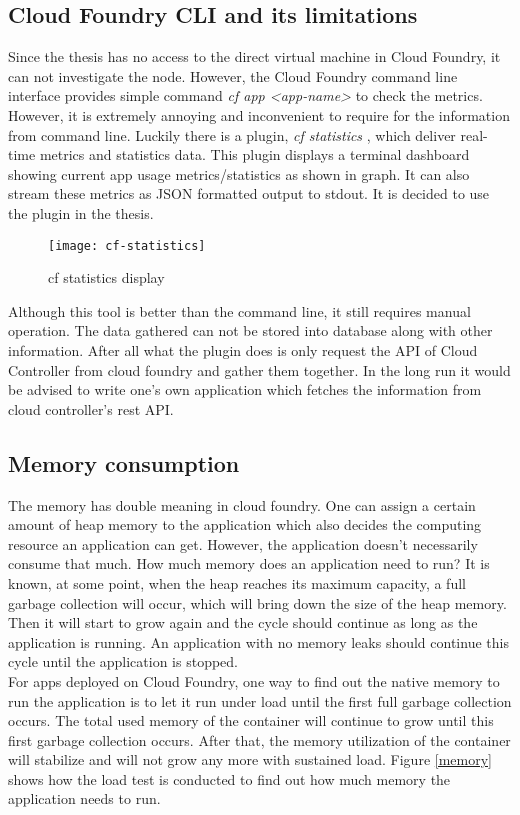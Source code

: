\subsection{Cloud Foundry CLI and its limitations}
Since the thesis has no access to the direct virtual machine in Cloud Foundry, it can not investigate the node. However, the Cloud Foundry command line interface provides simple command \textit{cf app <app-name>} to check the metrics. However, it is extremely annoying and inconvenient to require for the information from command line. Luckily there is a plugin, \textit{cf statistics} \citep{cfstatistics}, which deliver real-time metrics and statistics data. This plugin displays a terminal dashboard showing current app usage metrics/statistics as shown in graph. It can also stream these metrics as JSON formatted output to stdout. It is decided to use the plugin in the thesis. \\
\begin{figure}[h]
	\centering
	\texttt{[image: cf-statistics]}
	\caption{cf statistics display}
	\label{cf-statistics}
\end{figure}
Although this tool is better than the command line, it still requires manual operation. The data gathered can not be stored into database along with other information. After all what the plugin does is only request the API of Cloud Controller  \citep{cloudcontroller} from cloud foundry and gather them together. In the long run it would be advised to write one's own application which fetches the information from cloud controller's rest API. 
\subsection{Memory consumption}
The memory has double meaning in cloud foundry. One can assign a certain amount of heap memory to the application which also decides the computing resource an application can get. However, the application doesn't necessarily consume that much. How much memory does an application need to run? It is known, at some point, when the heap reaches its maximum capacity, a full garbage collection will occur, which will bring down the size of the heap memory. Then it will start to grow again and the cycle should continue as long as the application is running. An application with no memory leaks should continue this cycle until the application is stopped. \\
For apps deployed on Cloud Foundry, one way to find out the native memory to run the application is to let it run under load until the first full garbage collection occurs. The total used memory of the container will continue to grow until this first garbage collection occurs. After that, the memory utilization of the container will stabilize and will not grow any more with sustained load. Figure \ref{memory} shows how the load test is conducted to find out how much memory the application needs to run. 

